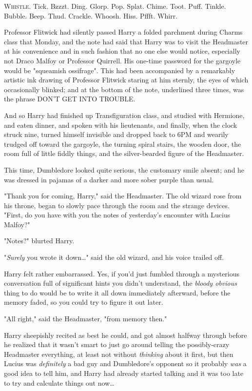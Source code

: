 
\lettrine{W}{histle}. Tick. 
Bzzzt. Ding. Glorp. Pop. Splat. Chime. Toot. Puff. Tinkle. Bubble. Beep. Thud. 
Crackle. Whoosh. Hiss. Pffft. Whirr.

Professor Flitwick had silently passed Harry a folded parchment during Charms 
class that Monday, and the note had said that Harry was to visit the Headmaster 
at his convenience and in such fashion that no one else would notice, 
especially not Draco Malfoy or Professor Quirrell. His one-time password for 
the gargoyle would be "squeamish ossifrage". This had been accompanied by a 
remarkably artistic ink drawing of Professor Flitwick staring at him sternly, 
the eyes of which occasionally blinked; and at the bottom of the note, 
underlined three times, was the phrase DON'T GET INTO TROUBLE.

And so Harry had finished up Transfiguration class, and studied with Hermione, 
and eaten dinner, and spoken with his lieutenants, and finally, when the clock 
struck nine, turned himself invisible and dropped back to 6PM and wearily 
trudged off toward the gargoyle, the turning spiral stairs, the wooden door, 
the room full of little fiddly things, and the silver-bearded figure of the 
Headmaster.

This time, Dumbledore looked quite serious, the customary smile absent; and he 
was dressed in pajamas of a darker and more sober purple than usual.

"Thank you for coming, Harry," said the Headmaster. The old wizard rose from 
his throne, began to slowly pace through the room and the strange devices. 
"First, do you have with you the notes of yesterday's encounter with Lucius 
Malfoy?"

"Notes?" blurted Harry.

"\emph{Surely} you wrote it down{\ldots}" said the old wizard, and his voice 
trailed off.

Harry felt rather embarrassed. Yes, if you'd just fumbled through a mysterious 
conversation full of significant hints you didn't understand, the \emph{bloody 
obvious} thing to do would be to write it all down immediately afterward, 
before the memory faded, so you could try to figure it out later.

"All right," said the Headmaster, "from memory then."

Harry sheepishly recited as best he could, and got almost halfway through 
before he realized that it wasn't smart to just go around telling the 
possibly-crazy Headmaster everything, at least not without \emph{thinking} 
about it first, but then Lucius was \emph{definitely} a bad guy and 
Dumbledore's opponent so it probably \emph{was} a good idea to tell him, and 
Harry had already started talking and it was too late to try and calculate 
things out now{\ldots}

